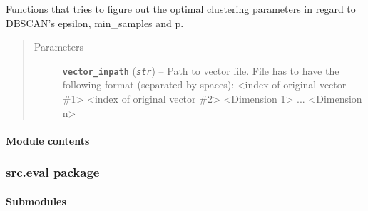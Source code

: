\documentclass[letterpaper,10pt,english]{sphinxmanual}
\begin{document}

\begin{fulllineitems}
\label{src.clustering:src.clustering.cluster_mappings.resolve_indices}
\end{fulllineitems}


\begin{fulllineitems}
\label{src.clustering:src.clustering.cluster_mappings.train_clustering_parameters}
Functions that tries to figure out the optimal clustering parameters in regard to DBSCAN's epsilon,
min\_samples and p.
\begin{quote}\begin{description}
\item[{Parameters}] \leavevmode
\textbf{\texttt{vector\_inpath}} (\emph{\texttt{str}}) -- Path to vector file. File has to have the following format (separated by spaces):
\textless{}index of original vector \#1\textgreater{} \textless{}index of original vector \#2\textgreater{} \textless{}Dimension 1\textgreater{} ... \textless{}Dimension n\textgreater{}

\end{description}\end{quote}

\end{fulllineitems}



\paragraph{Module contents}
\label{src.clustering:module-contents}\label{src.clustering:module-src.clustering}

\subsubsection{src.eval package}
\label{src.eval::doc}\label{src.eval:src-eval-package}

\paragraph{Submodules}
\label{src.eval:submodules}
\end{document}
